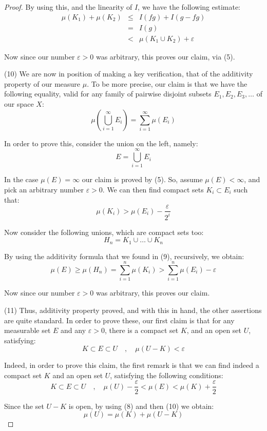 \documentclass[10pt,a4paper]{amsart}
\begin{document}
\begin{proof}
By using this, and the linearity of $I$, we have the following estimate:
\begin{eqnarray*}
\mu(K_1)+\mu(K_2)
&\leq&I(fg)+I(g-fg)\\
&=&I(g)\\
&<&\mu(K_1\cup K_2)+\varepsilon
\end{eqnarray*}

Now since our number $\varepsilon>0$ was arbitrary, this proves our claim, via (5).

\medskip

(10) We are now in position of making a key verification, that of the additivity property of our measure $\mu$. To be more precise, our claim is that we have the following equality, valid for any family of pairwise disjoint subsets $E_1,E_2,E_3,\ldots$ of our space $X$:
$$\mu\left(\bigcup_{i=1}^\infty E_i\right)=\sum_{i=1}^\infty\mu(E_i)$$

In order to prove this, consider the union on the left, namely:
$$E=\bigcup_{i=1}^\infty E_i$$

In the case $\mu(E)=\infty$ our claim is proved by (5). So, assume $\mu(E)<\infty$, and pick an arbitrary number $\varepsilon>0$. We can then find compact sets $K_i\subset E_i$ such that:
$$\mu(K_i)>\mu(E_i)-\frac{\varepsilon}{2^i}$$

Now consider the following unions, which are compact sets too:
$$H_n=K_1\cup\ldots\cup K_n$$

By using the additivity formula that we found in (9), recursively, we obtain:
$$\mu(E)
\geq\mu(H_n)
=\sum_{i=1}^n\mu(K_i)
>\sum_{i=1}^n\mu(E_i)-\varepsilon$$

Now since our number $\varepsilon>0$ was arbitrary, this proves our claim.

\medskip

(11) Thus, additivity property proved, and with this in hand, the other assertions are quite standard. In order to prove these, our first claim is that for any measurable set $E$ and any $\varepsilon>0$, there is a compact set $K$, and an open set $U$, satisfying:
$$K\subset E\subset U\quad,\quad \mu(U-K)<\varepsilon$$

Indeed, in order to prove this claim, the first remark is that we can find indeed a compact set $K$ and an open set $U$, satisfying the following conditions:
$$K\subset E\subset U\quad,\quad \mu(U)-\frac{\varepsilon}{2}<\mu(E)<\mu(K)+\frac{\varepsilon}{2}$$

Since the set $U-K$ is open, by using (8) and then (10) we obtain:
$$\mu(U)=\mu(K)+\mu(U-K)$$


\end{proof}
\end{document}
